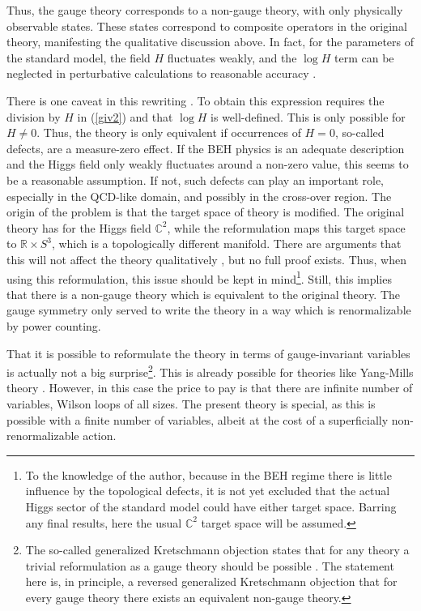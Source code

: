 \documentclass[final,twoside,12pt]{article}
\newcommand*{\pref}[1]{(\ref{#1})}
\newcommand*{\1}{1\!\!\!\bot}
\newcommand*{\rn}{\mathbb{R}}
\newcommand*{\cn}{\mathbb{C}}
\begin{document}
Thus, the gauge theory corresponds to a non-gauge theory, with only physically observable states. These states correspond to composite operators in the original theory, manifesting the qualitative discussion above. In fact, for the parameters of the standard model, the field $H$ fluctuates weakly, and the $\log H$ term can be neglected in perturbative calculations to reasonable accuracy \cite{Philipsen:1996af}.

There is one caveat in this rewriting \cite{Maas:2013aia}. To obtain this expression requires the division by $H$ in \pref{giv2} and that $\log H$ is well-defined. This is only possible for $H\neq 0$. Thus, the theory is only equivalent if occurrences of $H=0$, so-called defects, are a measure-zero effect. If the BEH physics is an adequate description and the Higgs field only weakly fluctuates around a non-zero value, this seems to be a reasonable assumption. If not, such defects can play an important role, especially in the QCD-like domain, and possibly in the cross-over region. The origin of the problem is that the target space of theory is modified. The original theory has for the Higgs field $\cn^2$, while the reformulation maps this target space to $\rn\times S^3$, which is a topologically different manifold. There are arguments that this will not affect the theory qualitatively  \cite{Callaway:1988ya,Kenna:1993fp,Fernandez:1992jh}, but no full proof exists. Thus, when using this reformulation, this issue should be kept in mind\footnote{To the knowledge of the author, because in the BEH regime there is little influence by the topological defects, it is not yet excluded that the actual Higgs sector of the standard model could have either target space. Barring any final results, here the usual $\cn^2$ target space will be assumed.}. Still, this implies that there is a non-gauge theory which is equivalent to the original theory. The gauge symmetry only served to write the theory in a way which is renormalizable by power counting.

That it is possible to reformulate the theory in terms of gauge-invariant variables is actually not a big surprise\footnote{The so-called generalized Kretschmann objection states that for any theory a trivial reformulation as a gauge theory should be possible \cite{Francois:2017aa}. The statement here is, in principle, a reversed generalized Kretschmann objection that for every gauge theory there exists an equivalent non-gauge theory.}. This is already possible for theories like Yang-Mills theory \cite{Gambini:1996ik}. However, in this case the price to pay is that there are infinite number of variables, Wilson loops \cite{Gattringer:2010zz} of all sizes. The present theory is special, as this is possible with a finite number of variables, albeit at the cost of a superficially non-renormalizable action.
\end{document}
